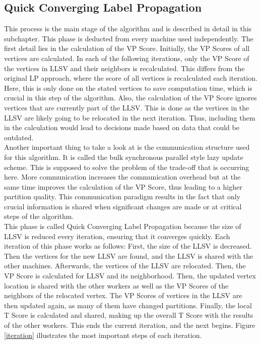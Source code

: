 \documentclass[acmsmall,nonacm,screen,review]{acmart}
\begin{document}
\subsection{Quick Converging Label Propagation}
This process is the main stage of the algorithm and is described in detail in this subchapter. This phase is deducted from every machine used independently. The first detail lies in the calculation of the VP Score. Initially, the VP Scores of all vertices are calculated. In each of the following iterations, only the VP Score of the vertices in LLSV and their neighbors is recalculated. This differs from the original LP approach, where the score of all vertices is recalculated each iteration. Here, this is only done on the stated vertices to save computation time, which is crucial in this step of the algorithm. Also, the calculation of the VP Score ignores vertices that are currently part of the LLSV. This is done as the vertices in the LLSV are likely going to be relocated in the next iteration. Thus, including them in the calculation would lead to decisions made based on data that could be outdated. \\
Another important thing to take a look at is the communication structure used for this algorithm. It is called the bulk synchronous parallel style \cite{BSP} lazy update scheme. This is supposed to solve the problem of the trade-off that is occurring here. More communication increases the communication overhead but at the same time improves the calculation of the VP Score, thus leading to a higher partition quality. This communication paradigm  results in the fact that only crucial information is shared when significant changes are made or at critical steps of the algorithm. \\
This phase is called Quick Converging Label Propagation because the size of LLSV is reduced every iteration, ensuring that it converges quickly. Each iteration of this phase works as follows: First, the size of the LLSV is decreased. Then the vertices for the new LLSV are found, and the LLSV is shared with the other machines. Afterwards, the vertices of the LLSV are relocated. Then, the VP Score is calculated for LLSV and its neighborhood. Then, the updated vertex location is shared with the other workers as well as the VP Scores of the neighbors of the relocated vertex. The VP Scores of vertices in the LLSV are then updated again, as many of them have changed partitions. Finally, the local T Score is calculated and shared, making up the overall T Score with the results of the other workers. This ends the current iteration, and the next begins. Figure \ref{iteration} illustrates the most important steps of each iteration. \\
\end{document}
